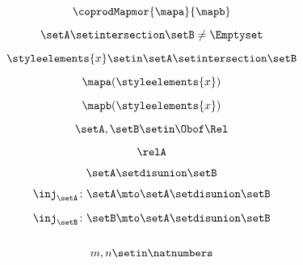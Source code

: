 \begin{forslides}
    \begin{equation}
        \label{eq:feedback-114}
        \coprodMapmor{\mapa}{\mapb}
    \end{equation}

    \begin{equation}
        \label{eq:feedback-115}
        \setA\setintersection \setB\neq \Emptyset
    \end{equation}

    \begin{equation}
        \label{eq:feedback-116}
        \styleelements{x}\setin \setA\setintersection \setB
    \end{equation}

    \begin{equation}
        \label{eq:feedback-117}
        \mapa(\styleelements{x})
    \end{equation}

    \begin{equation}
        \label{eq:feedback-118}
        \mapb(\styleelements{x})
    \end{equation}

    \begin{equation}
        \label{eq:feedback-119}
        \setA,\setB\setin \Obof\Rel
    \end{equation}

    \begin{equation}
        \label{eq:feedback-120}
        \relA
    \end{equation}

    \begin{equation}
        \label{eq:feedback-121}
        \setA \setdisunion \setB
    \end{equation}

    \begin{equation}
        \label{eq:feedback-122}
        \inj_\setA\colon \setA\mto \setA \setdisunion\setB
    \end{equation}

    \begin{equation}
        \label{eq:feedback-123}
        \inj_\setB\colon \setB\mto \setA \setdisunion\setB
    \end{equation}

    \begin{equation}
        \label{eq:feedback-124}
    \end{equation}

    \begin{equation}
        \label{eq:feedback-125}
        m,n\setin \natnumbers
    \end{equation}


\end{forslides}

